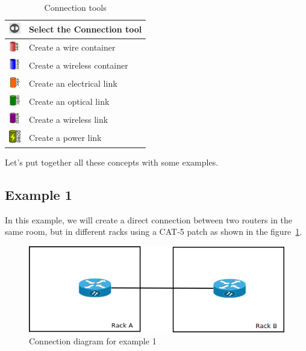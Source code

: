 \documentclass[a4paper]{article}
\begin{document}
		\begin{table}[h!]
			\centering
			\begin{tabular}{lp{10cm}}
				\includegraphics[width=0.5cm]{img/icon_connect_tool.png} & Select the Connection tool \\
				\midrule
				\includegraphics[width=0.5cm]{img/icon_wire_container.png} & Create a wire container \\
				\midrule
				\includegraphics[width=0.5cm]{img/icon_wireless_container.png} & Create a wireless container \\
				\midrule
				\includegraphics[width=0.5cm]{img/icon_electrical_link.png} & Create an electrical link \\
				\midrule
				\includegraphics[width=0.5cm]{img/icon_optical_link.png} & Create an optical link \\
				\midrule
				\includegraphics[width=0.5cm]{img/icon_wireless_link.png} & Create a wireless link \\
				\midrule
				\includegraphics[width=0.5cm]{img/icon_power_link.png} & Create a power link \\
			\end{tabular}
			\caption{Connection tools}
		\end{table}
		Let's put together all these concepts  with some examples. 
		\subsection{Example 1} \label{sec:physical_connections_example_1}
			In this example, we will create a direct connection between two routers in the same room, but in different racks using a CAT-5 patch as shown in the figure~\ref{fig:l1_example_1}.\newline
			\begin{figure}[h!]
				\centering
				\includegraphics[width=0.5\linewidth]{img/l1_example_1.png}
				\caption{Connection diagram for example 1}
				\label{fig:l1_example_1}
			\end{figure}
			
\end{document}

